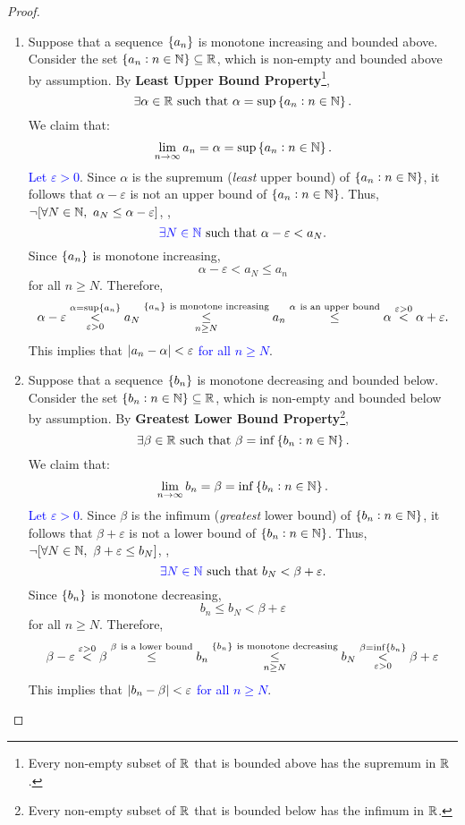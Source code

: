 \documentclass[11pt,openany]{article}
\begin{document}
\begin{proof}
\ \begin{enumerate}[(1)]
	\item Suppose that a sequence $\set{a_n}$ is monotone increasing and bounded above. Consider the set $\set{a_n:n\in\mathbb{N}}\subseteq\mathbb{R}$, which is non-empty and bounded above by assumption. By \textbf{Least Upper Bound Property}\footnote{Every non-empty subset of $\mathbb{R}$ that is bounded above has the supremum in $\mathbb{R}$.}, \[
	\exists\alpha\in\R\ \text{such that}\ \alpha=\sup\set{a_n:n\in\N}.
	\] We claim that: \[
	\lim\limits_{n\to\infty}a_n=\alpha=\sup\set{a_n:n\in\mathbb{N}}.
	\] \textcolor{blue}{Let $\varepsilon>0$}. Since $\alpha$ is the supremum (\textit{least} upper bound) of $\set{a_n:n\in\mathbb{N}}$,  it follows that $\alpha-\varepsilon$ is not an upper bound of $\set{a_n:n\in\mathbb{N}}$. Thus, $\lnot[\forall N\in\N,\ a_N\leq\alpha-\varepsilon]$, \ie, \[
	\textcolor{blue}{\exists N\in\mathbb{N}}\ \text{such that}\ \alpha-\varepsilon<a_N.
	\] Since $\set{a_n}$ is monotone increasing, \[
	\alpha-\varepsilon<a_N\leq a_n
	\] for all $n\geq N$. Therefore, \[
	\alpha-\varepsilon\overset{\alpha=\sup\set{a_n}}{\underset{\varepsilon>0}{<}}a_N
	\overset{\set{a_n}\ \text{is monotone increasing}}{\underset{n\geq N}{\leq}}a_n\overset{\alpha\ \text{is an upper bound}}{\leq}\alpha\overset{\varepsilon>0}{<}\alpha+\varepsilon.
	\] This implies that \textcolor{blue}{$\abs[0]{a_n-\alpha}<\varepsilon$ for all $n\geq N$}.
	\newpage
	\item Suppose that a sequence $\set{b_n}$ is monotone decreasing and bounded below. Consider the set $\set{b_n:n\in\mathbb{N}}\subseteq\mathbb{R}$, which is non-empty and bounded below by assumption. By \textbf{Greatest Lower Bound Property}\footnote{Every non-empty subset of $\mathbb{R}$ that is bounded below has the infimum in $\mathbb{R}$.}, \[
	\exists\beta\in\R\ \text{such that}\ \beta=\inf\set{b_n:n\in\N}.
	\] We claim that: \[
	\lim\limits_{n\to\infty}b_n=\beta=\inf\set{b_n:n\in\mathbb{N}}.
	\] \textcolor{blue}{Let $\varepsilon>0$}. Since $\beta$ is the infimum (\textit{greatest} lower bound) of $\set{b_n:n\in\mathbb{N}}$,  it follows that $\beta+\varepsilon$ is not a lower bound of $\set{b_n:n\in\mathbb{N}}$. Thus, $\lnot[\forall N\in\mathbb{N},\ \beta+\varepsilon\leq b_N]$, \ie, \[
	\textcolor{blue}{\exists N\in\mathbb{N}}\ \text{such that}\ b_N<\beta+\varepsilon.
	\] Since $\set{b_n}$ is monotone decreasing, \[
	b_n\leq b_N<\beta+\varepsilon
	\] for all $n\geq N$. Therefore, \[
	\beta-\varepsilon\overset{\varepsilon>0}{<}\beta\overset{\beta\ \text{is a lower bound}}{\leq}b_n\overset{\set{b_n}\ \text{is monotone decreasing}}{\underset{n\geq N}{\leq}} b_N\overset{\beta=\inf\set{b_n}}{\underset{\varepsilon>0}{<}}\beta+\varepsilon
	\]
	This implies that \textcolor{blue}{$\abs[0]{b_n-\beta}<\varepsilon$ for all $n\geq N$}.
\end{enumerate}
\end{proof}
\end{document}
